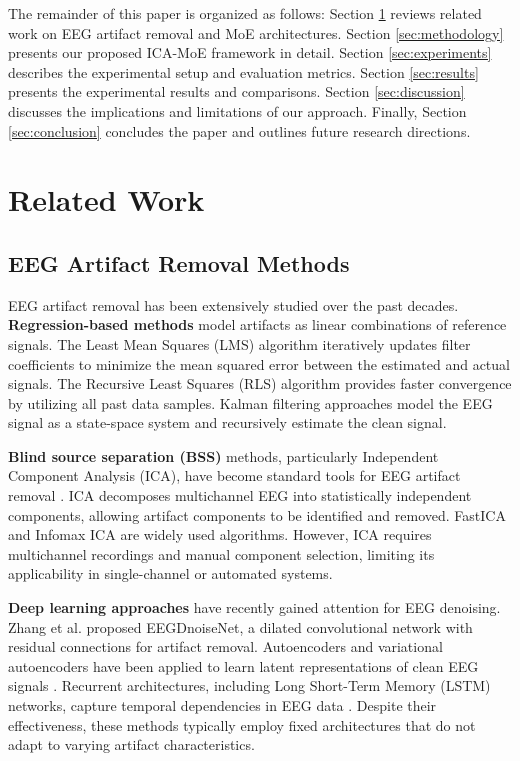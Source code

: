 \documentclass{article}
\begin{document}
The remainder of this paper is organized as follows: Section \ref{sec:related_work} reviews related work on EEG artifact removal and MoE architectures. Section \ref{sec:methodology} presents our proposed ICA-MoE framework in detail. Section \ref{sec:experiments} describes the experimental setup and evaluation metrics. Section \ref{sec:results} presents the experimental results and comparisons. Section \ref{sec:discussion} discusses the implications and limitations of our approach. Finally, Section \ref{sec:conclusion} concludes the paper and outlines future research directions.

\section{Related Work}
\label{sec:related_work}

\subsection{EEG Artifact Removal Methods}

EEG artifact removal has been extensively studied over the past decades. \textbf{Regression-based methods} model artifacts as linear combinations of reference signals. The Least Mean Squares (LMS) algorithm \cite{widrow1975adaptive} iteratively updates filter coefficients to minimize the mean squared error between the estimated and actual signals. The Recursive Least Squares (RLS) algorithm \cite{haykin2014adaptive} provides faster convergence by utilizing all past data samples. Kalman filtering approaches \cite{morbidi2008application} model the EEG signal as a state-space system and recursively estimate the clean signal.

\textbf{Blind source separation (BSS)} methods, particularly Independent Component Analysis (ICA), have become standard tools for EEG artifact removal \cite{jung2000removing}. ICA decomposes multichannel EEG into statistically independent components, allowing artifact components to be identified and removed. FastICA \cite{hyvarinen1999fast} and Infomax ICA \cite{bell1995information} are widely used algorithms. However, ICA requires multichannel recordings and manual component selection, limiting its applicability in single-channel or automated systems.

\textbf{Deep learning approaches} have recently gained attention for EEG denoising. Zhang et al. \cite{zhang2021eegdenoisenet} proposed EEGDnoiseNet, a dilated convolutional network with residual connections for artifact removal. Autoencoders and variational autoencoders have been applied to learn latent representations of clean EEG signals \cite{yang2018automatic}. Recurrent architectures, including Long Short-Term Memory (LSTM) networks, capture temporal dependencies in EEG data \cite{lawhern2018eegnet}. Despite their effectiveness, these methods typically employ fixed architectures that do not adapt to varying artifact characteristics.
\end{document}

